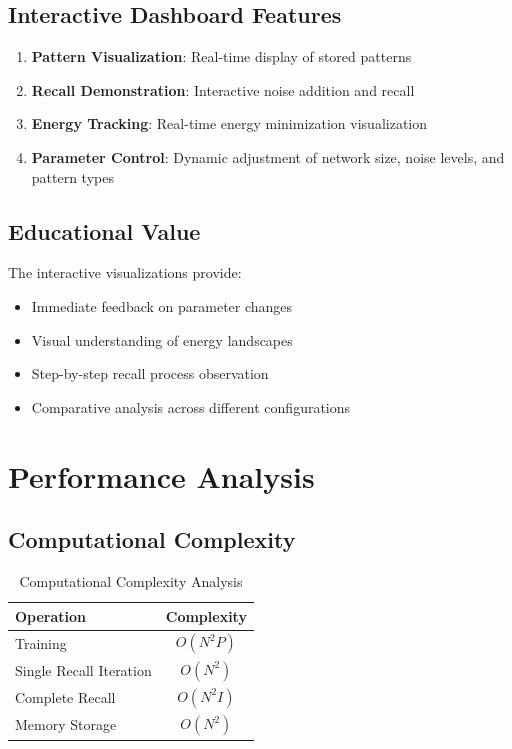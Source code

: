 \documentclass[11pt,a4paper]{article}
\begin{document}
\subsection{Interactive Dashboard Features}

\begin{enumerate}
    \item \textbf{Pattern Visualization}: Real-time display of stored patterns
    \item \textbf{Recall Demonstration}: Interactive noise addition and recall
    \item \textbf{Energy Tracking}: Real-time energy minimization visualization
    \item \textbf{Parameter Control}: Dynamic adjustment of network size, noise levels, and pattern types
\end{enumerate}

\subsection{Educational Value}

The interactive visualizations provide:
\begin{itemize}
    \item Immediate feedback on parameter changes
    \item Visual understanding of energy landscapes
    \item Step-by-step recall process observation
    \item Comparative analysis across different configurations
\end{itemize}

\section{Performance Analysis}

\subsection{Computational Complexity}

\begin{table}[H]
\centering
\caption{Computational Complexity Analysis}
\begin{tabular}{@{}lc@{}}
\toprule
Operation & Complexity \\
\midrule
Training & $O(N^2 P)$ \\
Single Recall Iteration & $O(N^2)$ \\
Complete Recall & $O(N^2 I)$ \\
Memory Storage & $O(N^2)$ \\
\bottomrule
\end{tabular}
\end{table}
\end{document}
